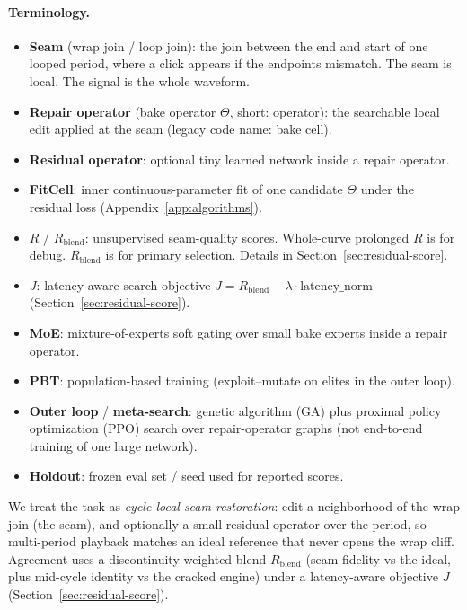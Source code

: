 \paragraph{Terminology.}
\begin{itemize}
  \item \textbf{Seam} (wrap join / loop join): the join between the end and start of one looped period, where a click appears if the endpoints mismatch. The seam is local. The signal is the whole waveform.
  \item \textbf{Repair operator} (bake operator $\Theta$, short: operator): the searchable local edit applied at the seam (legacy code name: bake cell).
  \item \textbf{Residual operator}: optional tiny learned network inside a repair operator.
  \item \textbf{FitCell}: inner continuous-parameter fit of one candidate $\Theta$ under the residual loss (Appendix~\ref{app:algorithms}).
  \item \textbf{$R$} / \textbf{$R_{\mathrm{blend}}$}: unsupervised seam-quality scores. Whole-curve prolonged $R$ is for debug. $R_{\mathrm{blend}}$ is for primary selection. Details in Section~\ref{sec:residual-score}.
  \item \textbf{$J$}: latency-aware search objective $J=R_{\mathrm{blend}}-\lambda\cdot\mathrm{latency\_norm}$ (Section~\ref{sec:residual-score}).
  \item \textbf{MoE}: mixture-of-experts soft gating over small bake experts inside a repair operator.
  \item \textbf{PBT}: population-based training (exploit--mutate on elites in the outer loop).
  \item \textbf{Outer loop} / \textbf{meta-search}: genetic algorithm (GA) plus proximal policy optimization (PPO) search over repair-operator graphs (not end-to-end training of one large network).
  \item \textbf{Holdout}: frozen eval set / seed used for reported scores.
\end{itemize}

We treat the task as \emph{cycle-local seam restoration}: edit a neighborhood of the wrap join (the seam), and optionally a small residual operator over the period, so multi-period playback matches an ideal reference that never opens the wrap cliff.
Agreement uses a discontinuity-weighted blend $R_{\mathrm{blend}}$ (seam fidelity vs the ideal, plus mid-cycle identity vs the cracked engine) under a latency-aware objective $J$ (Section~\ref{sec:residual-score}).


